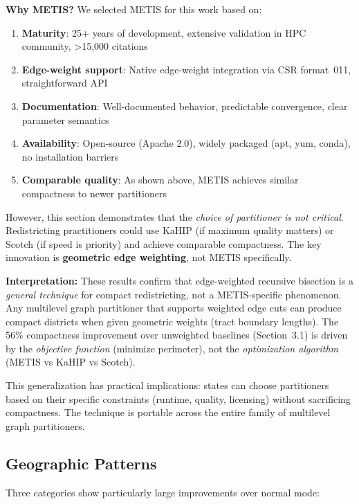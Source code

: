 \textbf{Why METIS?} We selected METIS for this work based on:
\begin{enumerate}
    \item \textbf{Maturity}: 25+ years of development, extensive validation in HPC community, >15,000 citations
    \item \textbf{Edge-weight support}: Native edge-weight integration via CSR format~011, straightforward API
    \item \textbf{Documentation}: Well-documented behavior, predictable convergence, clear parameter semantics
    \item \textbf{Availability}: Open-source (Apache 2.0), widely packaged (apt, yum, conda), no installation barriers
    \item \textbf{Comparable quality}: As shown above, METIS achieves similar compactness to newer partitioners
\end{enumerate}

However, this section demonstrates that the \textit{choice of partitioner is not critical}. Redistricting practitioners could use KaHIP (if maximum quality matters) or Scotch (if speed is priority) and achieve comparable compactness. The key innovation is \textbf{geometric edge weighting}, not METIS specifically.

\textbf{Interpretation:} These results confirm that edge-weighted recursive bisection is a \textit{general technique} for compact redistricting, not a METIS-specific phenomenon. Any multilevel graph partitioner that supports weighted edge cuts can produce compact districts when given geometric weights (tract boundary lengths). The 56\% compactness improvement over unweighted baselines (Section~3.1) is driven by the \textit{objective function} (minimize perimeter), not the \textit{optimization algorithm} (METIS vs KaHIP vs Scotch).

This generalization has practical implications: states can choose partitioners based on their specific constraints (runtime, quality, licensing) without sacrificing compactness. The technique is portable across the entire family of multilevel graph partitioners.

\subsection{Geographic Patterns}

Three categories show particularly large improvements over normal mode:

